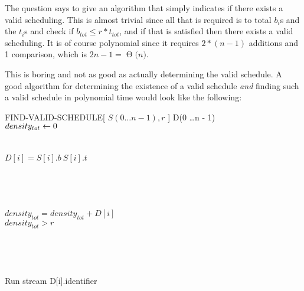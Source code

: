 \documentclass[11pts]{article}
\newcommand{\BigTheta}[1]{\ensuremath{\operatorname{\Theta}\bigl(#1\bigr)}}
\begin{document}
\begin{enumerate}
\begin{enumerate}
  The question says to give an algorithm that simply indicates if there exists
  a valid scheduling. This is almost trivial since all that is required is
  to total $b_i$s and the $t_i$s and check if $b_{tot} \le r*t_{tot}$, and
  if that is satisfied then there exists a valid scheduling. It is of
  course polynomial since it requires $2 * (n - 1)$ additions and 1
  comparison, which is $2n -1 = \BigTheta{n}$.

  This is boring and not as good as actually determining the valid schedule.
  A good algorithm for determining the existence of a valid schedule \emph{and}
  finding such a valid schedule in polynomial time would look like the
  following: \\

\begin{algorithm}{FIND-VALID-SCHEDULE}[ $S( 0 \dots n - 1 ), r$ ]{
   }
  D(0 \dots n - 1) \\
  $density_{tot} \mathrel{\leftarrow} 0$ \\

   \\
  \qdo \\
    $D[i] = S[i].b \ S[i].t$ \\
  \qrof
   \\
   \\
   \\
  \do \\
    $density_{tot} = density_{tot} + D[i]$ \\
    \qif $density_{tot} > r$ \\
    \qthen \\
      \qreturn \qfalse {}
    \qfi
  \qrof \\

   \\
  \do \\
    Run stream D[i].identifier
  \qrof \\

  \qreturn \qtrue {}
  
\end{algorithm}


\end{enumerate}
\end{enumerate}
\end{document}
